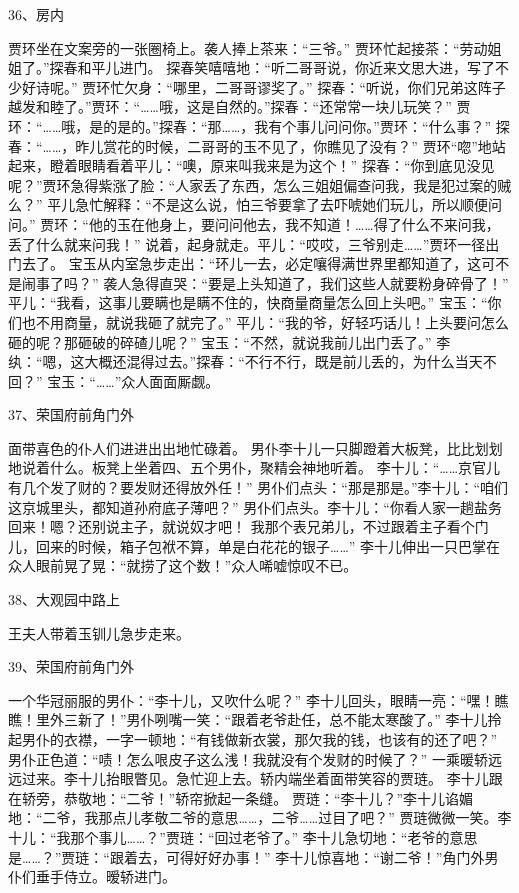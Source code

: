 36、房内\par
贾环坐在文案旁的一张圈椅上。袭人捧上茶来：“三爷。”
贾环忙起接茶：“劳动姐姐了。”探春和平儿进门。
探春笑嘻嘻地：“听二哥哥说，你近来文思大进，写了不少好诗呢。”
贾环忙欠身：“哪里，二哥哥谬奖了。”
探春：“听说，你们兄弟这阵子越发和睦了。”贾环：“……哦，这是自然的。”探春：“还常常一块儿玩笑？”
贾环：“……哦，是的是的。”探春：“那……，我有个事儿问问你。”贾环：“什么事？”
探春：“……，昨儿赏花的时候，二哥哥的玉不见了，你瞧见了没有？”
贾环“唿”地站起来，瞪着眼睛看着平儿：“噢，原来叫我来是为这个！”
探春：“你到底见没见呢？”贾环急得紫涨了脸：“人家丢了东西，怎么三姐姐偏查问我，我是犯过案的贼么？”
平儿急忙解释：“不是这么说，怕三爷要拿了去吓唬她们玩儿，所以顺便问问。”
贾环：“他的玉在他身上，要问问他去，我不知道！……得了什么不来问我，丢了什么就来问我！”
说着，起身就走。平儿：“哎哎，三爷别走……”贾环一径出门去了。
宝玉从内室急步走出：“环儿一去，必定嚷得满世界里都知道了，这可不是闹事了吗？”
袭人急得直哭：“要是上头知道了，我们这些人就要粉身碎骨了！”
平儿：“我看，这事儿要瞒也是瞒不住的，快商量商量怎么回上头吧。”
宝玉：“你们也不用商量，就说我砸了就完了。”
平儿：“我的爷，好轻巧话儿！上头要问怎么砸的呢？那砸破的碎碴儿呢？”
宝玉：“不然，就说我前儿出门丢了。”
李纨：“嗯，这大概还混得过去。”探春：“不行不行，既是前儿丢的，为什么当天不回？”
宝玉：“……”众人面面厮觑。

37、荣国府前角门外\par
面带喜色的仆人们进进出出地忙碌着。
男仆李十儿一只脚蹬着大板凳，比比划划地说着什么。板凳上坐着四、五个男仆，聚精会神地听着。
李十儿：“……京官儿有几个发了财的？要发财还得放外任！”
男仆们点头：“那是那是。”李十儿：“咱们这京城里头，都知道孙府底子薄吧？”
男仆们点头。李十儿：“你看人家一趟盐务回来！嗯？还别说主子，就说奴才吧！
我那个表兄弟儿，不过跟着主子看个门儿，回来的时候，箱子包袱不算，单是白花花的银子……”
李十儿伸出一只巴掌在众人眼前晃了晃：“就捞了这个数！”众人唏嘘惊叹不已。

38、大观园中路上\par
王夫人带着玉钏儿急步走来。

39、荣国府前角门外\par
一个华冠丽服的男仆：“李十儿，又吹什么呢？”
李十儿回头，眼睛一亮：“嘿！瞧瞧！里外三新了！”男仆咧嘴一笑：“跟着老爷赴任，总不能太寒酸了。”
李十儿拎起男仆的衣襟，一字一顿地：“有钱做新衣裳，那欠我的钱，也该有的还了吧？”
男仆正色道：“啧！怎么哏皮子这么浅！我就没有个发财的时候了？”
一乘暖轿远远过来。李十儿抬眼瞥见。急忙迎上去。轿内端坐着面带笑容的贾琏。
李十儿跟在轿旁，恭敬地：“二爷！”轿帘掀起一条缝。
贾琏：“李十儿？”李十儿谄媚地：“二爷，我那点儿孝敬二爷的意思……，二爷……过目了吧？”
贾琏微微一笑。李十儿：“我那个事儿……？”贾琏：“回过老爷了。”
李十儿急切地：“老爷的意思是……？”贾琏：“跟着去，可得好好办事！”
李十儿惊喜地：“谢二爷！”角门外男仆们垂手侍立。暧轿进门。

